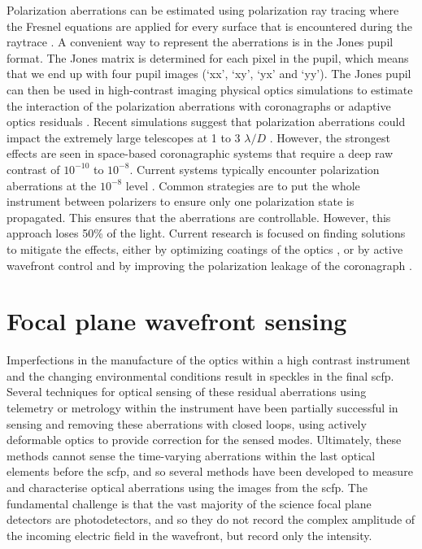 \documentclass[letterpaper]{ar-1col}
\newcommand{\ld}{$\lambda/D$}
\begin{document}
Polarization aberrations can be estimated using polarization ray tracing where the Fresnel equations are applied for every surface that is encountered during the raytrace \citep{ashcraft2023poke}. A convenient way to represent the aberrations is in the Jones pupil format. The Jones matrix is determined for each pixel in the pupil, which means that we end up with four pupil images (`xx', `xy', `yx' and `yy'). The Jones pupil can then be used in high-contrast imaging physical optics simulations to estimate the interaction of the polarization aberrations with coronagraphs \citep{Anche23} or adaptive optics residuals \citep{millar2022polarization}. Recent simulations suggest that polarization aberrations could impact the extremely large telescopes at 1 to 3 \ld{} \citep{Anche23}. However, the strongest effects are seen in space-based coronagraphic systems that require a deep raw contrast of $10^{-10}$ to $10^{-8}$. Current systems typically encounter polarization aberrations at the $10^{-8}$ level \citep{mawet2011recent, seo2019testbed, baudoz2024polarization}. Common strategies are to put the whole instrument between polarizers to ensure only one polarization state is propagated. This ensures that the aberrations are controllable. However, this approach loses 50\% of the light. Current research is focused on finding solutions to mitigate the effects, either by optimizing coatings of the optics \citep{balasubramanian2005polarization,miller2022birefringent}, or by active wavefront control \citep{mendillo2021dual} and by improving the polarization leakage of the coronagraph \citep{Doelman20, Doelman23}.

\section{Focal plane wavefront sensing}

Imperfections in the manufacture of the optics within a high contrast instrument and the changing environmental conditions result in speckles in the final \ac{scfp}.
%
Several techniques for optical sensing of these residual aberrations using telemetry or metrology within the instrument have been partially successful in sensing and removing these aberrations with closed loops, using actively deformable optics to provide correction for the sensed modes.
%
Ultimately, these methods cannot sense the time-varying aberrations within the last optical elements before the \ac{scfp}, and so several methods have been developed to measure and characterise optical aberrations using the images from the \ac{scfp}.
%
The fundamental challenge is that the vast majority of the science focal plane detectors are photodetectors, and so they do not record the complex amplitude of the incoming electric field in the wavefront, but record only the intensity.
\end{document}
